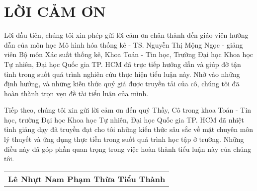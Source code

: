 \chapter*{LỜI CẢM ƠN}

Lời đầu tiên, chúng tôi xin phép gửi lời cảm ơn chân thành đến giáo viên hướng dẫn của môn học Mô hình hóa thống kê - TS. Nguyễn Thị Mộng Ngọc - giảng viên Bộ môn Xác suất thống kê, Khoa Toán - Tin học, Trường Đại học Khoa học Tự nhiên, Đại học Quốc gia TP. HCM đã trực tiếp hướng dẫn và giúp đỡ tận tình trong suốt quá trình nghiên cứu thực hiện tiểu luận này. Nhờ vào những định hướng, và những kiến thức quý giá được truyền tải của cô, chúng tôi đã hoàn thành trọn vẹn đề tài tiểu luận của mình.

Tiếp theo, chúng tôi xin gửi lời cảm ơn đến quý Thầy, Cô trong khoa Toán - Tin học, trường Đại học Khoa học Tự nhiên, Đại học Quốc gia TP. HCM đã nhiệt tình giảng dạy đã truyền đạt cho tôi những kiến thức sâu sắc về mặt chuyên môn lý thuyết và ứng dụng thực tiễn trong suốt quá trình học tập ở trường. Những điều này đã góp phần quan trọng trong việc hoàn thành tiểu luận này của chúng tôi.

\begin{flushright}
		\begin{tabular}{@{}c@{}}
			\bfseries Lê Nhựt Nam \quad Phạm Thừa Tiểu Thành \\
		\end{tabular}
\end{flushright}
\thispagestyle{empty}